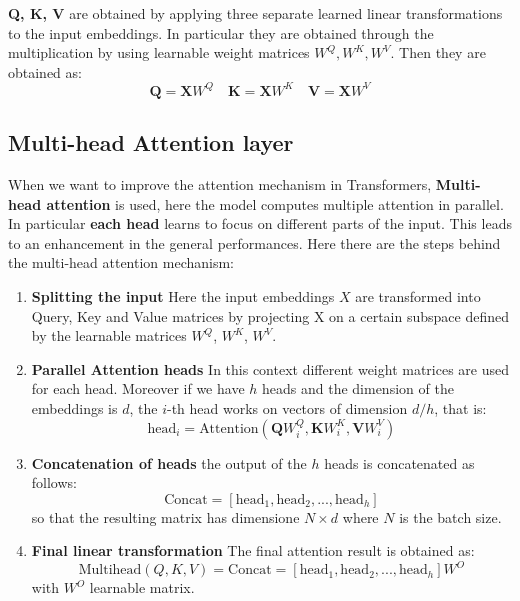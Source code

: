 \noindent
\textbf{Q, K, V} are obtained by applying three separate learned linear transformations to the input embeddings. In particular they are obtained through the multiplication by using learnable weight matrices $W^Q, W^K, W^V$. Then they are obtained as:
\begin{equation}
    \mathbf{Q}=\mathbf{X} W^Q \quad 
    \mathbf{K}=\mathbf{X} W^K \quad
    \mathbf{V}=\mathbf{X} W^V
\end{equation}
 



\subsection{Multi-head Attention layer}
When we want to improve the attention mechanism in Transformers, \textbf{Multi-head attention} is used, here the model computes multiple attention in parallel. In particular \textbf{each head} learns  to focus on different parts of the input. This leads to an enhancement in the general performances. Here there are the steps behind the multi-head attention mechanism: 
\begin{enumerate}
    \item \textbf{Splitting the input} Here the input embeddings $X$ are transformed into Query, Key and Value matrices by projecting X on a certain subspace defined by the learnable matrices $W^Q$, $W^K$, $W^V$.
    \item \textbf{Parallel Attention heads} In this context different weight matrices are used for each head. Moreover if we have $h$ heads and the dimension of the embeddings is $d$, the $i$-th head works on vectors of dimension $d/h$, that is:
    \begin{equation}
        \text{head}_i=\text{Attention}(\mathbf{Q}W_i^Q, \mathbf{K}W_i^K, \mathbf{V}W_i^V)
    \end{equation}
    \item \textbf{Concatenation of heads} the output of the $h$ heads is concatenated as follows:
    \begin{equation}
        \text{Concat}=[\text{head}_1,\text{head}_2,...,\text{head}_h]
    \end{equation}
    so that the resulting matrix has dimensione $N\times{d}$ where $N$ is the batch size.
    \item \textbf{Final linear transformation} The final attention result is obtained as: 
    \begin{equation}
        \text{Multihead}(Q,K,V)=\text{Concat}=[\text{head}_1,\text{head}_2,...,\text{head}_h]W^O
    \end{equation}
    with $W^O$ learnable matrix.
\end{enumerate}

